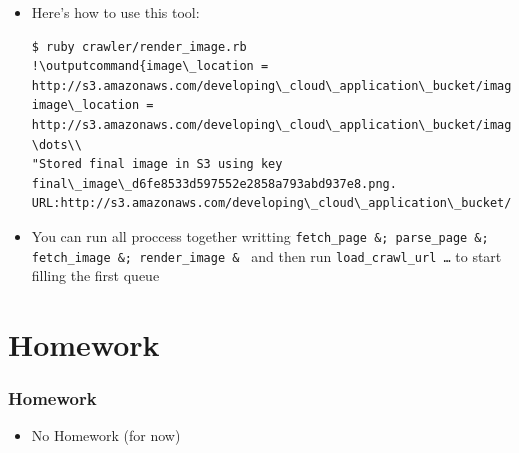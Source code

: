 \documentclass{beamer}
\newcommand{\outputcommand}[1]{\color{darkgreen}{#1|}}
\begin{document}
\begin{frame}
\begin{itemize}
\begin{lstlisting}[escapechar=&]
  output_image_name = "#{JSON.parse(msg.body)['page_title']}.#{Time.now}.png"
  key = 'final_image_' + Digest::MD5.hexdigest(output_image_name) + '.png'
  if upload_object( s3, bucket, key, output_image.to_blob, 'image/png')
    p "Stored final image in S3 using key #{key}. URL:http://s3.amazonaws.com/#{BOOK_BUCKET}/#{key}"
  else
    puts "Error uploading image #{img_url} to S3"
  end
end
\end{lstlisting}
\item Here’s how to use this tool:
\lstset{language=shell}
\begin{lstlisting}[escapechar=!]
$ ruby crawler/render_image.rb 
!\outputcommand{image\_location = http://s3.amazonaws.com/developing\_cloud\_application\_bucket/image\_bfd43e28e9c24b6aa58be89ca9ddf2c1.png\\
image\_location = http://s3.amazonaws.com/developing\_cloud\_application\_bucket/image\_f65b5f3577de03898c83e8d56df44d0a.png\\
\dots\\
"Stored final image in S3 using key final\_image\_d6fe8533d597552e2858a793abd937e8.png. URL:http://s3.amazonaws.com/developing\_cloud\_application\_bucket/final\_image\_d6fe8533d597552e2858a793abd937e8.png"}!
\end{lstlisting}

\item You can run all proccess together writting \texttt{fetch\_page \&; parse\_page \&; fetch\_image \&; render\_image \& } and then run \texttt{load\_crawl\_url \dots} to start filling the first queue
\end{itemize}

\end{frame}
\section{Homework}
\begin{frame}[fragile]
\frametitle{Homework}
\begin{itemize}
\item No Homework (for now)
\end{itemize}
\end{frame}
\end{document}
